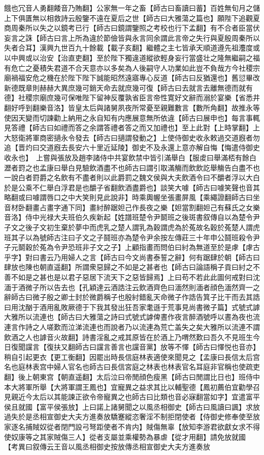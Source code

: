 餓也冗音人勇翻餧音乃賄翻】公家無一年之畜【師古曰畜讀曰蓄】百姓無旬月之儲上下俱匱無以相救詩云殷鑒不遠在夏后之世【師古曰大雅蕩之篇也】願陛下追觀夏商周秦所以失之以鏡考已行【師古曰鏡謂鑒照之考校也行下孟翻】有不合者臣當伏妄言之誅【師古曰言上所為違於節儉皆與永言同余謂此言帝之失行與夏殷周秦所以失者合耳】漢興九世百九十餘載【載子亥翻】繼體之主七皆承天順道遵先祖灋度或以中興或以治安【治直吏翻】至於陛下獨違道縱欲輕身妄行當盛壮之隆無繼嗣之福有危亡之憂積失君道不合天意亦以多矣為人後嗣守人功業如此豈不負哉方今社稷宗廟禍福安危之機在於陛下陛下誠能昭然遠寤專心反道【師古曰反猶還也】舊愆畢改新德既章則赫赫大異庶幾可銷天命去就庶幾可復【師古曰去就言去離無德而就有德】社稷宗廟庶幾可保唯陛下留神反覆孰省臣言帝性寛好文辭而溺於宴樂【省悉井翻好呼到翻樂音洛】皆皇太后與諸舅夙夜所常憂至親難數言【數所角翻】故推永等使因天變而切諫勸上納用之永自知有内應展意無所依違【師古曰展申也】每言事輒見答禮【師古曰如禮而答之余謂答禮者答之而又加禮也】至上此對【上時掌翻】上大怒衛將軍商密擿永令發去【師古曰擿謂發動之】上使侍御史收永敕過交道廐者勿追【晋灼曰交道廐去長安六十里近延陵】御史不及永還上意亦解自悔【悔遣侍御史收永也】　上嘗與張放及趙李諸侍中共宴飲禁中皆引滿舉白【服䖍曰舉滿桮有餘白瀝者罸之也孟康曰舉白見驗飲酒盡不也師古曰謂引取滿觴而飲飲訖舉觴告白盡不也一說白者罸爵之名飲有不盡者則以此爵罰之魏文侯與大夫飲酒令曰不釂者浮以大白於是公乘不仁舉白浮君是也釂子省翻飲酒盡爵也】談笑大噱【師古曰噱笑聲也音其略翻或曰噱謂唇口之中大笑則見此說非】時乘輿幄坐張畫屏風【乘繩證翻師古曰坐音材卧翻畫占畫字通下同】畫紂醉踞妲己作長夜之樂【妲當割翻妲己有蘇氏之女樂音洛】侍中光禄大夫班伯久疾新起【姓譜班楚令尹鬬班之後斑書叙傳自以為楚令尹子文之後子文初生棄於夢中而虎乳之楚人謂乳為穀謂虎為於菟故名穀於菟楚人謂虎班其子以為號師古注曰子文之子鬪班亦為楚令尹余按左傳莊三十年申公鬪班殺令尹子元鬬穀於菟為令尹恐班非子文之子】上顧指畫而問伯曰紂為無道至於是虖【虖古乎字】對曰書云乃用婦人之言【師古曰今文尚書泰誓之辭】何有踞肆於朝【師古曰肆放也陳也朝直遥翻】所謂衆惡歸之不如是之甚者也【師古曰論語稱子貢曰紂之不善不如是之甚也是以君子惡居下流天下之惡皆歸焉】上曰苟不若此此圖何戒對曰沈湎于酒微子所以告去也【孔穎達云酒誥注云飲酒齊色曰湎然則湎者顔色湎然齊一之辭師古曰微子殷之卿士封於微爵稱子也殷紂錯亂天命微子作誥告箕子比干而去其誥曰用沈酗于酒用亂敗厥德于下我其發出狂吾家耄遜于荒事見尚書微子篇】式號式謼大雅所以流連也【師古曰大雅蕩之詩曰式號式謼俾晝作夜言醉酒號呼以晝為夜也流連言作詩之人嗟歎而泣涕流連也而說者乃以流連為荒亡盖失之矣大雅所以流連不謂飲酒之人也謼音火故翻】詩書淫亂之戒其原皆在於酒上乃喟然歎曰吾久不見班生今日復聞讜言【復扶又翻師古曰讜言善言也讜音黨】放等不懌【師古曰懌悦也音亦】稍自引起更衣【更工衡翻】因罷出時長信庭林表適使來聞見之【孟康曰長信太后宫名也庭林表宫中婦人官名也師古曰長信宮庭之林表也林表官名耳庭非官稱也使疏吏翻】後上朝東宫【朝直遥翻】太后泣曰帝閒顔色瘦黑【師古曰閒謂比日也】班侍中本大將軍所舉【大將軍謂王鳳也】宜寵異之益求其比以輔聖德【鳳初薦伯宜勸學召見親近今太后以其能諫正欲令帝寵異之也師古曰比類也音必寐翻當如字】宜遣富平侯且就國【富平侯張放】上曰諾上諸舅聞之以風丞相御史【師古曰風讀曰諷】求放過失於是丞相宣御史大夫方進奏放驕蹇縱恣奢淫不制拒閉使者【侍御史修奉使至放家逐名捕賊奴從者閉門設弓弩距使者不肯内】賊傷無辜【放知李游君欲獻女求不得使奴康等之其家賊傷三人】從者支屬並乘權勢為暴虐【從才用翻】請免放就國　【考異曰叙傳云王音以風丞相御史按放傳丞相宣御史大夫方進奏放